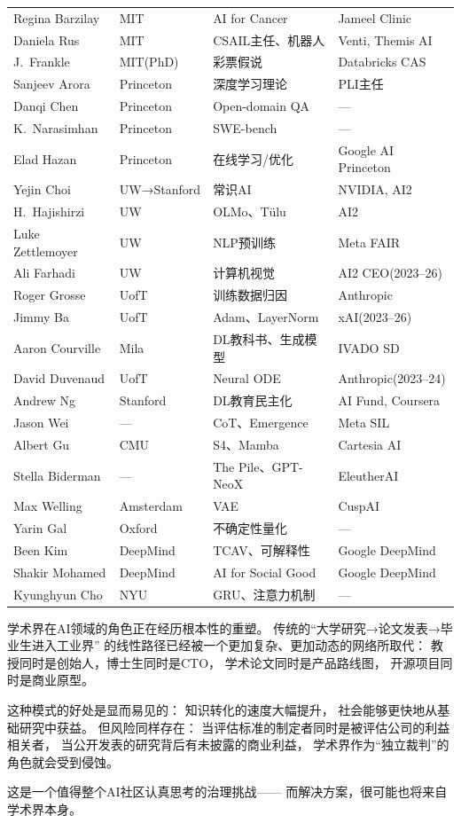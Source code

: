 \begin{table}[htbp]
\begin{tabularx}{\textwidth}{l l X l}
\midrule
Regina Barzilay & MIT & AI for Cancer & Jameel Clinic \\
Daniela Rus & MIT & CSAIL主任、机器人 & Venti, Themis AI \\
J.\ Frankle & MIT(PhD) & 彩票假说 & Databricks CAS \\
\midrule
Sanjeev Arora & Princeton & 深度学习理论 & PLI主任 \\
Danqi Chen & Princeton & Open-domain QA & — \\
K.\ Narasimhan & Princeton & SWE-bench & — \\
Elad Hazan & Princeton & 在线学习/优化 & Google AI Princeton \\
\midrule
Yejin Choi & UW→Stanford & 常识AI & NVIDIA, AI2 \\
H.\ Hajishirzi & UW & OLMo、T\"{u}lu & AI2 \\
Luke Zettlemoyer & UW & NLP预训练 & Meta FAIR \\
Ali Farhadi & UW & 计算机视觉 & AI2 CEO(2023--26) \\
\midrule
Roger Grosse & UofT & 训练数据归因 & Anthropic \\
Jimmy Ba & UofT & Adam、LayerNorm & xAI(2023--26) \\
Aaron Courville & Mila & DL教科书、生成模型 & IVADO SD \\
David Duvenaud & UofT & Neural ODE & Anthropic(2023--24) \\
\midrule
Andrew Ng & Stanford & DL教育民主化 & AI Fund, Coursera \\
Jason Wei & — & CoT、Emergence & Meta SIL \\
Albert Gu & CMU & S4、Mamba & Cartesia AI \\
Stella Biderman & — & The Pile、GPT-NeoX & EleutherAI \\
Max Welling & Amsterdam & VAE & CuspAI \\
Yarin Gal & Oxford & 不确定性量化 & — \\
Been Kim & DeepMind & TCAV、可解释性 & Google DeepMind \\
Shakir Mohamed & DeepMind & AI for Social Good & Google DeepMind \\
Kyunghyun Cho & NYU & GRU、注意力机制 & — \\
\bottomrule
\end{tabularx}
\end{table}

\bigskip

学术界在AI领域的角色正在经历根本性的重塑。
传统的``大学研究→论文发表→毕业生进入工业界''
的线性路径已经被一个更加复杂、更加动态的网络所取代：
教授同时是创始人，博士生同时是CTO，
学术论文同时是产品路线图，
开源项目同时是商业原型。

这种模式的好处是显而易见的：
知识转化的速度大幅提升，
社会能够更快地从基础研究中获益。
但风险同样存在：
当评估标准的制定者同时是被评估公司的利益相关者，
当公开发表的研究背后有未披露的商业利益，
学术界作为``独立裁判''的角色就会受到侵蚀。

这是一个值得整个AI社区认真思考的治理挑战——
而解决方案，很可能也将来自学术界本身。
